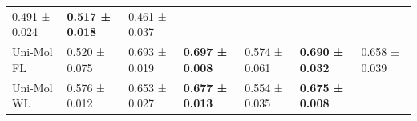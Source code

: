 \documentclass[
  10pt,
]{article}
\begin{document}
\begin{longtable}[]{@{}lllllll@{}}
\begin{minipage}[t]{0.12\columnwidth}
0.491 ± 0.024\strut
\end{minipage} & \begin{minipage}[t]{0.12\columnwidth}\raggedright
\textbf{0.517 ± 0.018}\strut
\end{minipage} & \begin{minipage}[t]{0.12\columnwidth}\raggedright
0.461 ± 0.037\strut
\end{minipage}\tabularnewline
\begin{minipage}[t]{0.12\columnwidth}\raggedright
Uni-Mol FL\strut
\end{minipage} & \begin{minipage}[t]{0.12\columnwidth}\raggedright
0.520 ± 0.075\strut
\end{minipage} & \begin{minipage}[t]{0.12\columnwidth}\raggedright
0.693 ± 0.019\strut
\end{minipage} & \begin{minipage}[t]{0.12\columnwidth}\raggedright
\textbf{0.697 ± 0.008}\strut
\end{minipage} & \begin{minipage}[t]{0.12\columnwidth}\raggedright
0.574 ± 0.061\strut
\end{minipage} & \begin{minipage}[t]{0.12\columnwidth}\raggedright
\textbf{0.690 ± 0.032}\strut
\end{minipage} & \begin{minipage}[t]{0.12\columnwidth}\raggedright
0.658 ± 0.039\strut
\end{minipage}\tabularnewline
\begin{minipage}[t]{0.12\columnwidth}\raggedright
Uni-Mol WL\strut
\end{minipage} & \begin{minipage}[t]{0.12\columnwidth}\raggedright
0.576 ± 0.012\strut
\end{minipage} & \begin{minipage}[t]{0.12\columnwidth}\raggedright
0.653 ± 0.027\strut
\end{minipage} & \begin{minipage}[t]{0.12\columnwidth}\raggedright
\textbf{0.677 ± 0.013}\strut
\end{minipage} & \begin{minipage}[t]{0.12\columnwidth}\raggedright
0.554 ± 0.035\strut
\end{minipage} & \begin{minipage}[t]{0.12\columnwidth}\raggedright
\textbf{0.675 ± 0.008}\strut
\end{minipage} & \begin{minipage}[t]{0.12\columnwidth}\raggedright

\end{minipage}
\end{longtable}
\end{document}
